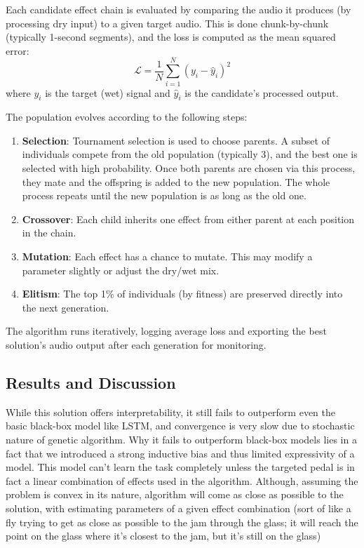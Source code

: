 \documentclass[masterthesis]{fer}
\begin{document}
Each candidate effect chain is evaluated by comparing the audio it produces (by processing dry input) to a given target audio. This is done chunk-by-chunk (typically 1-second segments), and the loss is computed as the mean squared error:
\[
\mathcal{L} = \frac{1}{N} \sum_{i=1}^{N} (y_i - \hat{y}_i)^2
\]
where \( y_i \) is the target (wet) signal and \( \hat{y}_i \) is the candidate's processed output.

The population evolves according to the following steps:
\begin{enumerate}
    \item \textbf{Selection}: Tournament selection is used to choose parents. A subset of individuals compete from the old population (typically 3), and the best one is selected with high probability. Once both parents are chosen via this process, they mate and the offspring is added to the new population. The whole process repeats until the new population is as long as the old one.
    \item \textbf{Crossover}: Each child inherits one effect from either parent at each position in the chain.
    \item \textbf{Mutation}: Each effect has a chance to mutate. This may modify a parameter slightly or adjust the dry/wet mix.
    \item \textbf{Elitism}: The top 1\% of individuals (by fitness) are preserved directly into the next generation.
\end{enumerate}

The algorithm runs iteratively, logging average loss and exporting the best solution’s audio output after each generation for monitoring.

\subsection{Results and Discussion}

While this solution offers interpretability, it still fails to outperform even the basic black-box model like LSTM, and convergence is very slow due to stochastic nature of genetic algorithm. Why it fails to outperform black-box models lies in a fact that we introduced a strong inductive bias and thus limited expressivity of a model. This model can't learn the task completely unless the targeted pedal is in fact a linear combination of effects used in the algorithm. Although, assuming the problem is convex in its nature, algorithm will come as close as possible to the solution, with estimating parameters of a given effect combination (sort of like a fly trying to get as close as possible to the jam through the glass; it will reach the point on the glass where it's closest to the jam, but it's still on the glass)
\end{document}
